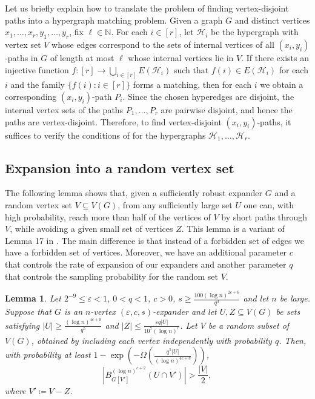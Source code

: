 \documentclass[10pt]{article}
\theoremstyle{plain}
\numberwithin{theorem}{section}
\newtheorem{lemma}[theorem]{Lemma}
\theoremstyle{definition}
\theoremstyle{remark}
\newcommand{\cH}{\mathcal{H}}
\renewcommand{\setminus}{-}
\newcommand{\eps}{\varepsilon}
\theoremstyle{plain}
\begin{document}
Let us briefly explain how to translate the problem of finding vertex-disjoint paths 
into a hypergraph matching problem.  
Given a graph $G$ and distinct vertices $x_1,\dots,x_r,y_1,\dots,y_r$, fix 
$\ell\in\mathbb N$. For each $i\in[r]$, let $\cH_i$ be the hypergraph with vertex set 
$V$ whose edges correspond to the sets of internal vertices of all $(x_i,y_i)$-paths 
in $G$ of length at most $\ell$ whose internal vertices lie in $V$. If there exists an injective function 
$f:[r]\to\bigcup_{i\in[r]}E(\cH_i)$ such that $f(i)\in E(\cH_i)$ for each $i$ and the 
family $\{f(i):i\in[r]\}$ forms a matching, then for each $i$ we obtain a 
corresponding $(x_i,y_i)$-path $P_i$. Since the chosen hyperedges are disjoint, the 
internal vertex sets of the paths $P_1,\dots,P_r$ are pairwise disjoint, and hence 
the paths are vertex-disjoint.  Therefore, to find vertex-disjoint $(x_i,y_i)$-paths, it suffices to verify the 
conditions of  for the hypergraphs $\cH_1,\dots,\cH_r$.



	\subsection{Expansion into a random vertex set} \label{subsec:random-step-one}

		The following lemma shows that, given a sufficiently robust expander $G$ and a random vertex set $V\subseteq V(G)$, from any sufficiently large set $U$ one can, with high probability, reach more than half of the vertices of $V$ by short paths through $V$, while avoiding a given small set of vertices $Z$. This lemma is a variant of Lemma 17 in \cite{bucic2022erdos}. The main difference is that instead of a forbidden set of edges we have a forbidden set of vertices. Moreover, we have an additional parameter $c$ that controls the rate of expansion of our expanders and another parameter $q$ that controls the sampling probability for the random set $V$.

		\begin{lemma} \label{lem:expansion-random}
			Let $2^{-9} \le \eps < 1$, $0 < q < 1$, $c > 0$, $s \ge \frac{100 (\log n)^{2c+6}}{q^3}$ and let $n$ be large. Suppose that $G$ is an $n$-vertex $(\eps, c, s)$-expander and let $U, Z \subseteq V(G)$ be sets satisfying $|U| \ge \frac{(\log n)^{4c+9}}{q^5}$ and $|Z| \le \frac{\eps q |U|}{10^7(\log n)^{c}}$. Let $V$ be a random subset of $V(G)$, obtained by including each vertex independently with probability $q$.
			Then, with probability at least $1 - \exp\left(-\Omega\left(\frac{q^5|U|}{(\log n)^{4c+8}}\right)\right)$,
			\begin{equation*}
				\left| B^{(\log n)^{c+2}}_{G[V']}(U \cap V') \right| > \frac{|V|}{2},
			\end{equation*}
			where $V' \coloneqq V \setminus Z$.
		\end{lemma}
\end{document}
